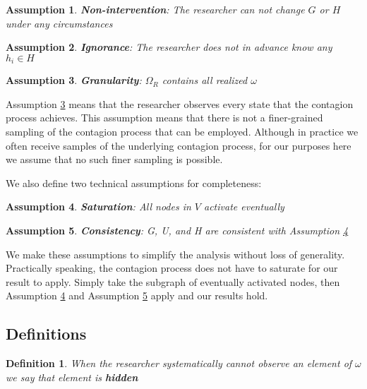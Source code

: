 \documentclass[a4paper]{article}
\newtheorem{definition}{Definition}
\newtheorem{assn}{Assumption}
\begin{document}
\begin{assn} \label{assn:immutability}
\textbf{Non-intervention}: The researcher can not change $G$ or $H$ under any circumstances
\end{assn}

\begin{assn} \label{assn:ignorance}
\textbf{Ignorance}: The researcher does not in advance know any $h_i \in H$
\end{assn}

\begin{assn} \label{assn:perfect_obs}
\textbf{Granularity}: $\Omega_R$ contains all realized $\omega$
\end{assn}

\noindent
Assumption \ref{assn:perfect_obs} means that the researcher observes every state that the contagion process achieves. This assumption means that there is not a finer-grained sampling of the contagion process that can be employed. Although in practice we often receive samples of the underlying contagion process, for our purposes here we assume that no such finer sampling is possible.

We also define two technical assumptions for completeness:

\begin{assn} \label{assn:saturation}
\textbf{Saturation}: All nodes in $V$ activate eventually
\end{assn}

\begin{assn} \label{assn:consistency}
\textbf{Consistency}: G, U, and H are consistent with Assumption \ref{assn:saturation}
\end{assn}

\noindent
We make these assumptions to simplify the analysis without loss of generality. Practically speaking, the contagion process does not have to saturate for our result to apply. Simply take the subgraph of eventually activated nodes, then Assumption \ref{assn:saturation} and Assumption \ref{assn:consistency} apply and our results hold.

\subsection{Definitions}

\begin{definition} \label{def:knowledge}
When the researcher systematically cannot observe an element of $\omega$ we say that element is \textbf{hidden}
\end{definition}
\end{document}
